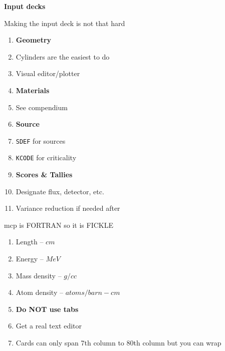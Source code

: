 \documentclass[aspectratio=1610,pdftex,dvipsnames,compress,xcolor={dvipsnames}]{beamer}
\newcommand{\acs}{\acrshort} %
\begin{document}
\begin{frame}[plain]{}
    \centering\LARGE\textbf{Input decks}
\end{frame}


\addtocounter{framenumber}{-1} 
\begin{frame}{Making the input deck is not that hard}
    \begin{enumerate}[series=outerlist,topsep=0pt,itemsep=0pt,leftmargin=*,label=(\arabic*)]
        \item[]\textbf{Geometry}
        \item[]Cylinders are the easiest to do
        \item[]Visual editor/plotter
            \vspace{0.15in}
        \item[]\textbf{Materials}
        \item[]See compendium
            \vspace{0.15in}
        \item[]\textbf{Source}
        \item[]\texttt{SDEF} for sources
        \item[]\texttt{KCODE} for criticality
            \vspace{0.15in}
        \item[]\textbf{Scores \& Tallies}
        \item[]Designate flux, detector, etc.
            \vspace{0.15in}
        \item[]Variance reduction if needed after
    \end{enumerate}
\end{frame}


\begin{frame}{\acs{mcp} is FORTRAN so it is FICKLE}
    \begin{enumerate}[series=outerlist,topsep=0pt,itemsep=21pt,leftmargin=*,label=(\arabic*)]
        \item[]Length -- $cm$
        \item[]Energy -- $MeV$
        \item[]Mass density -- $g/cc$
        \item[]Atom density -- $atoms/barn-cm$
        \item[]\textbf{Do NOT use tabs}
        \item[]Get a real text editor
        \item[]Cards can only span 7th column to 80th column but you can wrap
    \end{enumerate}
\end{frame}
\end{document}
